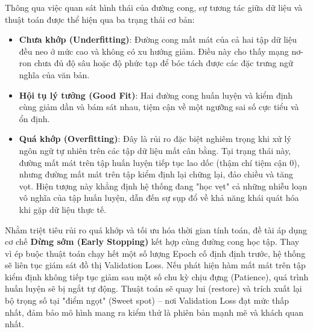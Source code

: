 Thông qua việc quan sát hình thái của đường cong, sự tương tác giữa dữ liệu và thuật toán được thể hiện qua ba trạng thái cơ bản:
\begin{itemize}
	\item \textbf{Chưa khớp (Underfitting)}: Đường cong mất mát của cả hai tập dữ liệu đều neo ở mức cao và không có xu hướng giảm. Điều này cho thấy mạng nơ-ron chưa đủ độ sâu hoặc độ phức tạp để bóc tách được các đặc trưng ngữ nghĩa của văn bản.
	
	\item \textbf{Hội tụ lý tưởng (Good Fit)}: Hai đường cong huấn luyện và kiểm định cùng giảm dần và bám sát nhau, tiệm cận về một ngưỡng sai số cực tiểu và ổn định.
	
	\item \textbf{Quá khớp (Overfitting)}: Đây là rủi ro đặc biệt nghiêm trọng khi xử lý ngôn ngữ tự nhiên trên các tập dữ liệu mất cân bằng. Tại trạng thái này, đường mất mát trên tập huấn luyện tiếp tục lao dốc (thậm chí tiệm cận 0), nhưng đường mất mát trên tập kiểm định lại chững lại, đảo chiều và tăng vọt. Hiện tượng này khẳng định hệ thống đang "học vẹt" cả những nhiễu loạn vô nghĩa của tập huấn luyện, dẫn đến sự sụp đổ về khả năng khái quát hóa khi gặp dữ liệu thực tế.
\end{itemize}

Nhằm triệt tiêu rủi ro quá khớp và tối ưu hóa thời gian tính toán, đề tài áp dụng cơ chế \textbf{Dừng sớm (Early Stopping)} kết hợp cùng đường cong học tập. Thay vì ép buộc thuật toán chạy hết một số lượng Epoch cố định định trước, hệ thống sẽ liên tục giám sát đồ thị Validation Loss. Nếu phát hiện hàm mất mát trên tập kiểm định không tiếp tục giảm sau một số chu kỳ chịu đựng (Patience), quá trình huấn luyện sẽ bị ngắt tự động. Thuật toán sẽ quay lui (restore) và trích xuất lại bộ trọng số tại "điểm ngọt" (Sweet spot) – nơi Validation Loss đạt mức thấp nhất, đảm bảo mô hình mang ra kiểm thử là phiên bản mạnh mẽ và khách quan nhất.